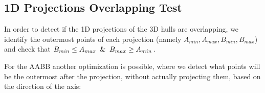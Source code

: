 \documentclass{PoliMi_MasterThesis}
\begin{document}
\subsection{1D Projections Overlapping Test} \label{ssec:1d_projection_overlapping_test}
In order to detect if the 1D projections of the 3D hulls are overlapping, we identify the outermost points of each projection (namely $A_{min}, A_{max}, B_{min}, B_{max}$) and check that $B_{min} \leq A_{max} \And B_{max} \geq A_{min}$.

For the AABB another optimization is possible, where we detect what points will be the outermost after the projection, without actually projecting them, based on the direction of the axis:

\begin{figure}[H]
    \centering
    \quad
	\caption{}
    \label{fig:aabb_projected_extremes}
\end{figure}
\end{document}
